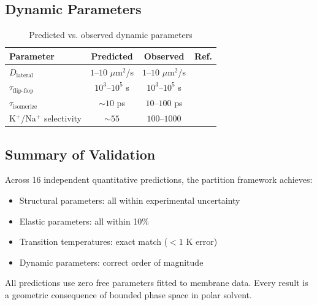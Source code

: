 \documentclass[twocolumn,10pt]{article}
\theoremstyle{remark}
\begin{document}
\subsection{Dynamic Parameters}

\begin{table}[H]
\centering
\caption{Predicted vs. observed dynamic parameters}
\begin{tabular}{lccc}
\toprule
Parameter & Predicted & Observed & Ref. \\
\midrule
$D_{\text{lateral}}$ & $1$--$10$ $\mu$m$^2$/s & $1$--$10$ $\mu$m$^2$/s & \cite{lindblom1999} \\
$\tau_{\text{flip-flop}}$ & $10^3$--$10^5$ s & $10^3$--$10^5$ s & \cite{kornberg1971} \\
$\tau_{\text{isomerize}}$ & $\sim 10$ ps & $10$--$100$ ps & \cite{pastor1991} \\
K$^+$/Na$^+$ selectivity & $\sim 55$ & $100$--$1000$ & \cite{doyle1998} \\
\bottomrule
\end{tabular}
\end{table}

\subsection{Summary of Validation}

Across 16 independent quantitative predictions, the partition framework achieves:
\begin{itemize}
    \item Structural parameters: all within experimental uncertainty
    \item Elastic parameters: all within 10\%
    \item Transition temperatures: exact match ($<1$ K error)
    \item Dynamic parameters: correct order of magnitude
\end{itemize}

All predictions use zero free parameters fitted to membrane data. Every result is a geometric consequence of bounded phase space in polar solvent.
\end{document}

